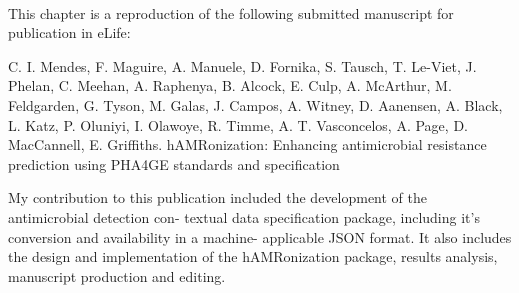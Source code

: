 \mbox{}\\
\vspace{8cm}


This chapter is a reproduction of the following submitted manuscript for publication in eLife:

C. I. Mendes, F. Maguire, A. Manuele, D. Fornika, S. Tausch, T. Le-Viet, J. Phelan, C. Meehan, A. Raphenya, B. Alcock, E. Culp, A. McArthur, M. Feldgarden, G. Tyson, M. Galas, J. Campos, A. Witney, D. Aanensen, A. Black, L. Katz, P. Oluniyi, I. Olawoye, R. Timme, A. T. Vasconcelos, A. Page, D. MacCannell, E. Griffiths. 
hAMRonization: Enhancing antimicrobial resistance prediction using PHA4GE standards and specification



My contribution to this publication included the development of the antimicrobial detection con-
textual data specification package, including it’s conversion and availability in a machine-
applicable JSON format. It also includes the design and implementation of the hAMRonization package, results analysis, manuscript production and editing. 